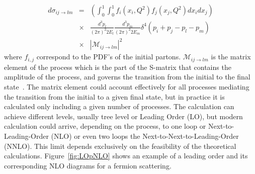 \begin{eqnarray}
  \label{eq:DiffXS}
  d\sigma_{ij\rightarrow lm} & = & \left( \int_{0}^{1}\int_{0}^{1}f_{i}(x_{i},Q^{2})f_{j}(x_{j},Q^{2})dx_{i}dx_{j} \right) \nonumber \\  
 & \times & \frac{d^{3}p_{l}}{(2\pi)^{2}2E_{l}}\frac{d^{3}p_{m}}{(2\pi)^{2}2E_{m}}\delta^{4}\left( p_{i}+p_{j}-p_{l}-p_{m} \right) \nonumber \\  
 & \times & |\mathcal{M}_{ij\rightarrow lm}|^{2}
\end{eqnarray} where $f_{i,j}$ correspond to the PDF's of the initial partons. $\mathcal{M}_{ij\rightarrow lm}$ is the matrix element of the process which is the part of the S-matrix that contains the amplitude of the process, and governs the transition from the initial to the final state~\cite{opac-b1131978}. The matrix element could account effectively for all processes mediating the transition from the initial to a given final state, but in practice it is calculated only including a given number of processes. The calculation can achieve different levels, usually tree level or Leading Order (LO), but modern calculation could arrive, depending on the process, to one loop or Next-to-Leading-Order (NLO) or even two loops the  Next-to-Next-to-Leading-Order (NNLO). This limit depends exclusively on the feasibility of the theoretical calculations. Figure~\ref{fig:LOpNLO} shows an example of a leading order and its corresponding NLO diagrams for a fermion scattering.

